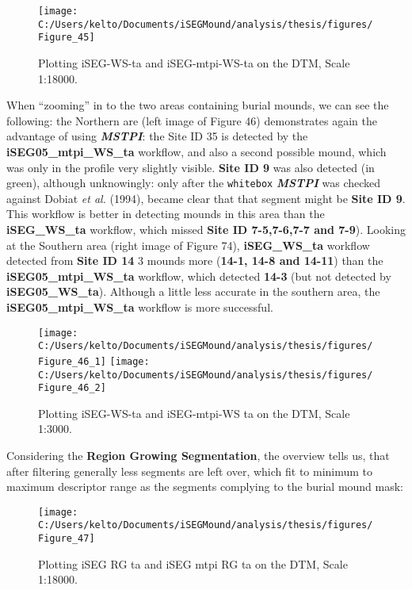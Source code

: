 \documentclass[
  12pt,
]{article}
\begin{document}
\begin{figure}

{\centering \texttt{[image: C:/Users/kelto/Documents/iSEGMound/analysis/thesis/figures/Figure\_45]} 

}

\caption{Plotting iSEG-WS-ta and iSEG-mtpi-WS-ta on the DTM, Scale 1:18000.}\label{fig:Figure45}
\end{figure}

When ``zooming'' in to the two areas containing burial mounds, we can see the following: the Northern are (left image of Figure 46) demonstrates again the advantage of using \textbf{\emph{MSTPI}}: the Site ID 35 is detected by the \textbf{iSEG05\_mtpi\_WS\_ta} workflow, and also a second possible mound, which was only in the profile very slightly visible. \textbf{Site ID 9} was also detected (in green), although unknowingly: only after the \texttt{whitebox} \textbf{\emph{MSTPI}} was checked against Dobiat \emph{et al.} (1994), became clear that that segment might be \textbf{Site ID 9}. This workflow is better in detecting mounds in this area than the \textbf{iSEG\_WS\_ta} workflow, which missed \textbf{Site ID 7-5,7-6,7-7 and 7-9}).
Looking at the Southern area (right image of Figure 74), \textbf{iSEG\_WS\_ta} workflow detected from \textbf{Site ID 14} 3 mounds more (\textbf{14-1, 14-8 and 14-11}) than the \textbf{iSEG05\_mtpi\_WS\_ta} workflow, which detected \textbf{14-3} (but not detected by \textbf{iSEG05\_WS\_ta}).
Although a little less accurate in the southern area, the \textbf{iSEG05\_mtpi\_WS\_ta} workflow is more successful.

\begin{figure}
\texttt{[image: C:/Users/kelto/Documents/iSEGMound/analysis/thesis/figures/Figure\_46\_1]} \texttt{[image: C:/Users/kelto/Documents/iSEGMound/analysis/thesis/figures/Figure\_46\_2]} \caption{Plotting iSEG-WS-ta and iSEG-mtpi-WS ta on the DTM, Scale 1:3000.}\label{fig:Figure46}
\end{figure}

Considering the \textbf{Region Growing Segmentation}, the overview tells us, that after filtering generally less segments are left over, which fit to minimum to maximum descriptor range as the segments complying to the burial mound mask:

\begin{figure}

{\centering \texttt{[image: C:/Users/kelto/Documents/iSEGMound/analysis/thesis/figures/Figure\_47]} 

}

\caption{Plotting iSEG RG ta and iSEG mtpi RG ta on the DTM, Scale 1:18000.}\label{fig:Figure47}
\end{figure}
\end{document}
